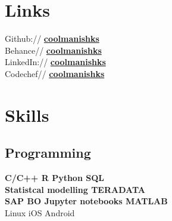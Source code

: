 \documentclass[a4paper]{deedy-resume} %
\begin{document}
\begin{minipage}[t]{0.33\textwidth}
\section{Links} 

Github:// \href{https://github.com/coolmanishks}{\bf coolmanishks} \\
Behance// \href{https://www.behance.net/coolmanishks}{\bf coolmanishks}\\
LinkedIn:// \href{https://www.linkedin.com/in/coolmanishks}{\bf coolmanishks} \\
Codechef// \href{https://www.codechef.com/users/coolmanishks}{\bf coolmanishks}\\

\sectionspace %








\section{Skills}

\subsection{Programming}

\textbf{C/C++ \textbullet{} R \textbullet{} Python  \textbullet{} SQL \\
Statistcal modelling\textbullet{} TERADATA \\
SAP BO \textbullet{}  Jupyter notebooks \textbullet{} MATLAB } \\
Linux \textbullet{} iOS \textbullet{} Android \textbullet{}
\sectionspace

\end{minipage}
\end{document}
